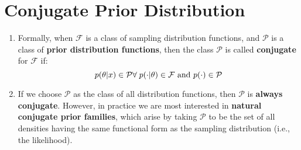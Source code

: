 \section{Conjugate Prior Distribution \cite{ism-1}} \label{conjugate prior distribution}

\begin{enumerate}
    \item Formally, when $\mathcal{F}$ is a class of sampling distribution functions, and $\mathcal{P}$ is a class of \textbf{prior distribution functions}, then the class $\mathcal{P}$ is called \textbf{conjugate} for $\mathcal{F}$ if:
    \[
        \hfill
        p(\theta|x) \in \mathcal{P} 
        \hfill
        \forall\; 
        p(\cdot|\theta) \in \mathcal{F} 
        \text{ and } 
        p(\cdot) \in \mathcal{P}
    \]

    \item If we choose $\mathcal{P}$ as the class of all distribution functions, then $\mathcal{P}$ is \textbf{always conjugate}. However, in practice we are most interested in \textbf{natural conjugate prior families}, which arise by taking $\mathcal{P}$ to be the set of all densities having the same functional form as the sampling distribution (i.e., the likelihood).
\end{enumerate}





































